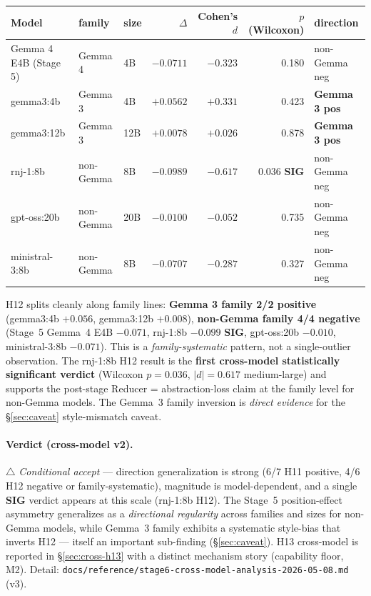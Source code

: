 \documentclass[11pt]{article}
\newcommand{\code}[1]{\texttt{#1}}
\newcommand{\sig}{\textbf{SIG}}
\begin{document}
\begin{table}[h]
\centering
\small
\begin{tabular}{@{}lllrrrl@{}}
\toprule
Model & family & size & $\Delta$ & Cohen's $d$ & $p$ (Wilcoxon) & direction \\
\midrule
Gemma 4 E4B (Stage 5) & Gemma 4 & 4B & $-0.0711$ & $-0.323$ & 0.180 & non-Gemma neg \\
gemma3:4b & Gemma 3 & 4B & $\mathbf{+0.0562}$ & $+0.331$ & 0.423 & \textbf{Gemma 3 pos} \\
gemma3:12b & Gemma 3 & 12B & $\mathbf{+0.0078}$ & $+0.026$ & 0.878 & \textbf{Gemma 3 pos} \\
rnj-1:8b & non-Gemma & 8B & $\mathbf{-0.0989}$ & $\mathbf{-0.617}$ & $\mathbf{0.036}$ \sig & non-Gemma neg \\
gpt-oss:20b & non-Gemma & 20B & $-0.0100$ & $-0.052$ & 0.735 & non-Gemma neg \\
ministral-3:8b & non-Gemma & 8B & $\mathbf{-0.0707}$ & $\mathbf{-0.287}$ & 0.327 & non-Gemma neg \\
\bottomrule
\end{tabular}
\end{table}

H12 splits cleanly along family lines: \textbf{Gemma 3 family 2/2 positive} (gemma3:4b $+0.056$, gemma3:12b $+0.008$), \textbf{non-Gemma family 4/4 negative} (Stage~5 Gemma~4 E4B $-0.071$, rnj-1:8b $-0.099$ \sig, gpt-oss:20b $-0.010$, ministral-3:8b $-0.071$). This is a \emph{family-systematic} pattern, not a single-outlier observation. The rnj-1:8b H12 result is the \textbf{first cross-model statistically significant verdict} (Wilcoxon $p\!=\!0.036$, $|d|\!=\!0.617$ medium-large) and supports the post-stage Reducer = abstraction-loss claim at the family level for non-Gemma models. The Gemma~3 family inversion is \emph{direct evidence} for the \S\ref{sec:caveat} style-mismatch caveat.

\paragraph{Verdict (cross-model v2).}\hspace{-0.4em} $\triangle$ \emph{Conditional accept} --- direction generalization is strong (6/7 H11 positive, 4/6 H12 negative or family-systematic), magnitude is model-dependent, and a single \sig{} verdict appears at this scale (rnj-1:8b H12). The Stage~5 position-effect asymmetry generalizes as a \emph{directional regularity} across families and sizes for non-Gemma models, while Gemma~3 family exhibits a systematic style-bias that inverts H12 --- itself an important sub-finding (\S\ref{sec:caveat}). H13 cross-model is reported in \S\ref{sec:cross-h13} with a distinct mechanism story (capability floor, M2). Detail: \code{docs/reference/stage6-cross-model-analysis-2026-05-08.md} (v3).
\end{document}
